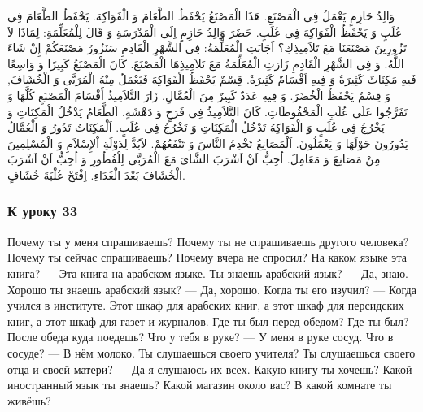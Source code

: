 \documentclass[a5paper]{article}
\begin{document}
وَالِدُ حَازِمٍ يَعْمَلُ فِى الْمَصْنَعِ. هَذَا الْمَصْنَعُ يَحْفَظُ الطَّعَامَ وَ الْفَوَاكِهَ. يَحْفَظُ الطَّعَامَ فِى عُلَبٍ وَ يَحْفَظُ الْفَوَاكِهَ فِى عُلَبٍ. حَضَرَ وَالِدُ حَازِمٍ اِلَى الْمَدْرَسَةِ وَ قَالَ لِلْمُعَلِّمَةِ: لِمَاذَا لاَ تَزُورِينَ مَصْنَعَنَا مَعَ تَلاَمِيذِكِ؟ اَجَابَتِ الْمُعَلِّمَةُ: فِى الشَّهْرِ الْقَادِمِ سَنَزُورُ مَصْنَعَكُمْ إِنْ شَاءَ اللَّهُ. وَ فِى الشَّهْرِ الْقَادِمِ زَارَتِ الْمُعَلِّمَةُ مَعَ تَلاَمِيذِهَا الْمَصْنَعَ. كَانَ الْمَصْنَعُ كَبِيرًا وَ وَاسِعًا فَيهِ مَكِنَاتٌ كَثِيرَةٌ وَ فِيهِ اَقْسَامٌ كَثِيرَةٌ. قِسْمٌ يَحْفَظُ الْفَوَاكِهَ فَيَعْمَلُ مِنْهُ الْمُرَبَّى وَ الْخُشَافَ, وَ قِسْمٌ يَحْفَظُ الْخُضَرَ. وَ فِيهِ عَدَدٌ كَبِيرٌ مِنَ الْعُمَّالِ. زَارَ التَّلاَمِيذُ أَقْسَامَ الْمَصْنَعِ كُلَّهَا وَ تَفَرَّجُوا عَلَى عُلَبِ الْمَحْفُوظَاتِ. كَانَ التَّلاَمِيذُ فِى فَرَحٍ وَ دَهْشَةٍ. اَلطَّعَامُ يَدْخُلُ الْمَكِنَاتِ وَ يَخْرُجُ فِى عُلَبٍ وَ الْفَوَاكِهُ تَدْخُلُ الْمَكِنَاتِ وَ تَخْرُجُ فِى عُلَبٍ. اَلْمَكِنَاتُ تَدُورُ وَ الْعُمَّالُ يَدُورُونَ حَوْلَهَا وَ يَعْمَلُونَ. اَلْمَصَانِعُ تَخْدِمُ النَّاسَ وَ تَنْفَعُهُمْ. لاَبُدَّ لِدَوْلَةِ اْلإِسْلاَمِ وَ الْمُسْلِمِينَ مِنْ مَصَانِعَ وَ مَعَامِلَ. اُحِبُّ اَنْ اَشْرَبَ الشَّاىَ مَعَ الْمُرَبَّى لِلْفُطُورِ وَ اُحِبُّ اَنْ اَشْرَبَ الْخُشَافَ بَعْدَ الْغَدَاءِ. اِفْتَحْ عُلْبَةَ خُشَافٍ.

\subsubsection{К уроку 33}
Почему ты у меня спрашиваешь? Почему ты не спрашиваешь другого человека? Почему ты сейчас спрашиваешь? Почему вчера не спросил? На каком языке эта книга? — Эта книга на арабском языке. Ты знаешь арабский язык? — Да, знаю. Хорошо ты знаешь арабский язык? — Да, хорошо. Когда ты его изучил? — Когда учился в институте. Этот шкаф для арабских книг, а этот шкаф для персидских книг, а этот шкаф для газет и журналов. Где ты был перед обедом? Где ты был? После обеда куда поедешь? Что у тебя в руке? — У меня в руке сосуд. Что в сосуде? — В нём молоко. Ты слушаешься своего учителя? Ты слушаешься своего отца и своей матери? — Да я слушаюсь их всех. Какую книгу ты хочешь? Какой иностранный язык ты знаешь? Какой магазин около вас? В какой комнате ты живёшь?
\end{document}

